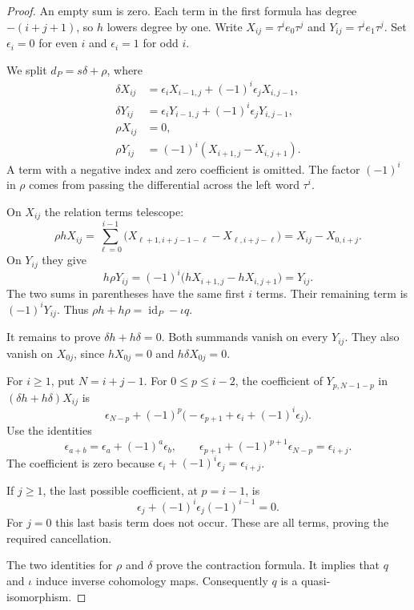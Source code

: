 \begin{proof}
An empty sum is zero. Each term in the first formula has degree
$-(i+j+1)$, so $h$ lowers degree by one.
Write $X_{ij}=\tau^i e_0\tau^j$ and $Y_{ij}=\tau^i e_1\tau^j$.
Set $\epsilon_i=0$ for even $i$ and $\epsilon_i=1$ for odd $i$.

We split $d_P=s\delta+\rho$, where
\[
 \begin{split}
 \delta X_{ij}&=\epsilon_iX_{i-1,j}
                       +(-1)^i\epsilon_jX_{i,j-1},\\
 \delta Y_{ij}&=\epsilon_iY_{i-1,j}
                       +(-1)^i\epsilon_jY_{i,j-1},\\
 \rho X_{ij}&=0,\\
 \rho Y_{ij}&=(-1)^i(X_{i+1,j}-X_{i,j+1}).
 \end{split}
\]
A term with a negative index and zero coefficient is omitted.
The factor $(-1)^i$ in $\rho$ comes from passing the differential across
the left word $\tau^i$.

On $X_{ij}$ the relation terms telescope:
\[
 \rho hX_{ij}
 =\sum_{\ell=0}^{i-1}
     \bigl(X_{\ell+1,i+j-1-\ell}-X_{\ell,i+j-\ell}\bigr)
 =X_{ij}-X_{0,i+j}.
\]
On $Y_{ij}$ they give
\[
 h\rho Y_{ij}
 =(-1)^i\bigl(hX_{i+1,j}-hX_{i,j+1}\bigr)=Y_{ij}.
\]
The two sums in parentheses have the same first $i$ terms.
Their remaining term is $(-1)^iY_{ij}$.
Thus $\rho h+h\rho=\operatorname{id}_P-\iota q$.

It remains to prove $\delta h+h\delta=0$.
Both summands vanish on every $Y_{ij}$.
They also vanish on $X_{0j}$, since $hX_{0j}=0$ and $h\delta X_{0j}=0$.

For $i\geq1$, put $N=i+j-1$. For $0\leq p\leq i-2$, the coefficient
of $Y_{p,N-1-p}$ in $(\delta h+h\delta)X_{ij}$ is
\[
 \epsilon_{N-p}
 +(-1)^p\bigl(-\epsilon_{p+1}+\epsilon_i+(-1)^i\epsilon_j\bigr).
\]
Use the identities
\[
 \epsilon_{a+b}=\epsilon_a+(-1)^a\epsilon_b,
 \qquad \epsilon_{p+1}+(-1)^{p+1}\epsilon_{N-p}
       =\epsilon_{i+j}.
\]
The coefficient is zero because
$\epsilon_i+(-1)^i\epsilon_j=\epsilon_{i+j}$.

If $j\geq1$, the last possible coefficient, at $p=i-1$, is
\[
 \epsilon_j+(-1)^i\epsilon_j(-1)^{i-1}=0.
\]
For $j=0$ this last basis term does not occur.
These are all terms, proving the required cancellation.

The two identities for $\rho$ and $\delta$ prove the contraction formula.
It implies that $q$ and $\iota$ induce inverse cohomology maps.
Consequently $q$ is a quasi-isomorphism.
\end{proof}

